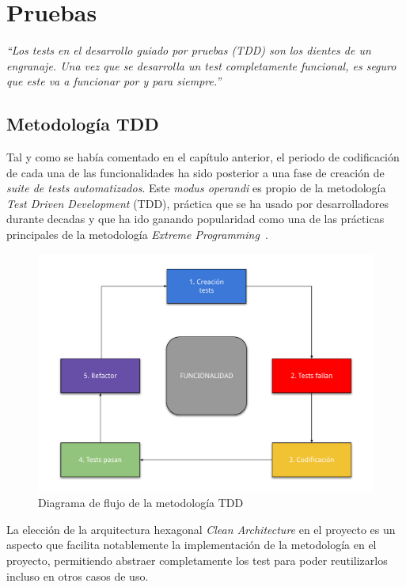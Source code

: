 \chapter{Pruebas}

\textit{``Los tests en el desarrollo guiado por pruebas (TDD) son los dientes de un engranaje.
Una vez que se desarrolla un test completamente funcional, es seguro que este va a funcionar por y
para siempre.''~\cite{beck2003test}
}

\section{Metodología TDD}
Tal y como se había comentado en el capítulo anterior, el periodo de codificación de cada una de las
funcionalidades ha sido posterior a una fase de creación de \textit{suite de tests automatizados}. 
Este \textit{modus operandi}
es propio de la metodología \textit{Test Driven Development} (TDD), práctica que se ha usado por desarrolladores durante
decadas y que ha ido ganando popularidad como una de las prácticas principales de
la metodología \textit{Extreme Programming}~\cite{1510569}.

\begin{figure}[H]
    \centering
    \includegraphics[scale=0.7]{images/tdd_diagram.pdf}
    \caption{Diagrama de flujo de la metodología TDD}
    \label{fig:tdd-diagram}
\end{figure}

La elección de la arquitectura hexagonal \textit{Clean Architecture} en el proyecto es un aspecto que
facilita notablemente la implementación de la metodología en el proyecto, permitiendo
abstraer completamente los test para poder reutilizarlos incluso en otros casos de uso.

